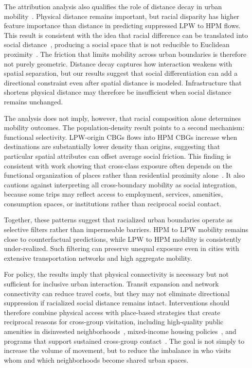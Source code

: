 \documentclass[9pt,twocolumn,twoside]{pnas-new}
\begin{document}
The attribution analysis also qualifies the role of distance decay in urban mobility~\cite{tobler1970computer, miller2004tobler}. Physical distance remains important, but racial disparity has higher feature importance than distance in predicting suppressed LPW to HPM flows. This result is consistent with the idea that racial difference can be translated into social distance~\cite{bogardus1933social}, producing a social space that is not reducible to Euclidean proximity~\cite{bourdieu1989social}. The friction that limits mobility across urban boundaries is therefore not purely geometric. Distance decay captures how interaction weakens with spatial separation, but our results suggest that social differentiation can add a directional constraint even after spatial distance is modeled. Infrastructure that shortens physical distance may therefore be insufficient when social distance remains unchanged.

The analysis does not imply, however, that racial composition alone determines mobility outcomes. The population-density result points to a second mechanism: functional selectivity. LPW-origin CBGs flows into HPM CBGs increase when destinations are substantially lower density than origins, suggesting that particular spatial attributes can offset average social friction. This finding is consistent with work showing that cross-class exposure often depends on the functional organization of places rather than residential proximity alone~\cite{massenkoff2023rubbing}. It also cautions against interpreting all cross-boundary mobility as social integration, because some trips may reflect access to employment, services, amenities, consumption spaces, or institutions rather than reciprocal social contact.

Together, these patterns suggest that racialized urban boundaries operate as selective filters rather than impermeable barriers. HPM to LPW mobility remains close to counterfactual predictions, while LPW to HPM mobility is consistently under-realized. Such filtering can preserve unequal exposure even in cities with extensive transportation networks and high aggregate mobility.

For policy, the results imply that physical connectivity is necessary but not sufficient for inclusive urban interaction. Transit expansion and network connectivity can reduce travel costs, but they may not eliminate directional suppression if racialized social distance remains intact. Interventions should therefore combine physical access with place-based strategies that create reciprocal reasons for cross-group visitation, including high-quality public amenities in disinvested neighborhoods~\cite{klinenberg2018palaces}, mixed-income housing policies~\cite{chetty2016effects}, and programs that support sustained cross-group contact~\cite{allport1954nature, pettigrew2006meta}. The goal is not simply to increase the volume of movement, but to reduce the imbalance in who visits whom and which neighborhoods become shared urban spaces.
\end{document}
